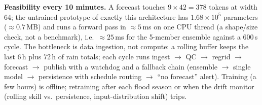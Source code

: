 \noindent\textbf{Feasibility every 10 minutes.} A forecast touches $9\times42{=}378$ tokens at width 64; the untrained prototype of exactly this architecture has $1.68\times10^{5}$ parameters ($\approx0.7$\,MB) and runs a forward pass in $\approx5$\,ms on one CPU thread (a shape/size check, not a benchmark), i.e.\ $\approx25$\,ms for the 5-member ensemble against a 600\,s cycle. The bottleneck is data ingestion, not compute: a rolling buffer keeps the last 6\,h plus 72\,h of rain totals; each cycle runs ingest $\to$ QC $\to$ regrid $\to$ forecast $\to$ publish with a watchdog and a fallback chain (ensemble $\to$ single model $\to$ persistence with schedule routing $\to$ ``no forecast'' alert). Training (a few hours) is offline; retraining after each flood season or when the drift monitor (rolling skill vs.\ persistence, input-distribution shift) trips.

